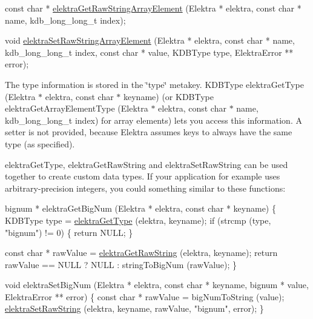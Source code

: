 \begin{DoxyCode}
\textcolor{keyword}{const} \textcolor{keywordtype}{char} * \hyperlink{group__highlevel_ga1b704f49a8e87262b670cd191ba61bb3}{elektraGetRawStringArrayElement} (Elektra * elektra, \textcolor{keyword}{const} \textcolor{keywordtype}{char} 
      * name, kdb\_long\_long\_t index);

\textcolor{keywordtype}{void} \hyperlink{group__highlevel_ga965e0b2ce7d5e8938965259c3f584600}{elektraSetRawStringArrayElement} (Elektra * elektra, \textcolor{keyword}{const} \textcolor{keywordtype}{char} * name, 
      kdb\_long\_long\_t index, \textcolor{keyword}{const} \textcolor{keywordtype}{char} * value, KDBType type, ElektraError ** error);
\end{DoxyCode}


The type information is stored in the {\ttfamily \char`\"{}type\char`\"{}} metakey. {\ttfamily K\+D\+B\+Type elektra\+Get\+Type (Elektra $\ast$ elektra, const char $\ast$ keyname)} (or {\ttfamily K\+D\+B\+Type elektra\+Get\+Array\+Element\+Type (Elektra $\ast$ elektra, const char $\ast$ name, kdb\+\_\+long\+\_\+long\+\_\+t index)} for array elements) lets you access this information. A setter is not provided, because Elektra assumes keys to always have the same type (as specified).

{\ttfamily elektra\+Get\+Type}, {\ttfamily elektra\+Get\+Raw\+String} and {\ttfamily elektra\+Set\+Raw\+String} can be used together to create custom data types. If your application for example uses arbitrary-\/precision integers, you could something similar to these functions\+:


\begin{DoxyCode}
bignum * elektraGetBigNum (Elektra * elektra, \textcolor{keyword}{const} \textcolor{keywordtype}{char} * keyname)
\{
  KDBType type = \hyperlink{group__highlevel_ga34afc074c83cf9ccd0a183573f8498a1}{elektraGetType} (elektra, keyname);
  \textcolor{keywordflow}{if} (strcmp (type, \textcolor{stringliteral}{"bignum"}) != 0)
  \{
    \textcolor{keywordflow}{return} NULL;
  \}

  \textcolor{keyword}{const} \textcolor{keywordtype}{char} * rawValue = \hyperlink{group__highlevel_gae6c8eff14fb431cce5afb405fa2511e3}{elektraGetRawString} (elektra, keyname);
  \textcolor{keywordflow}{return} rawValue == NULL ? NULL : stringToBigNum (rawValue);
\}

\textcolor{keywordtype}{void} elektraSetBigNum (Elektra * elektra, \textcolor{keyword}{const} \textcolor{keywordtype}{char} * keyname, bignum * value, ElektraError ** error)
\{
  \textcolor{keyword}{const} \textcolor{keywordtype}{char} * rawValue = bigNumToString (value);
  \hyperlink{group__highlevel_ga67d2f8d48b040d79c3d4a665c4f6410f}{elektraSetRawString} (elektra, keyname, rawValue, \textcolor{stringliteral}{"bignum"}, error);
\}
\end{DoxyCode}


